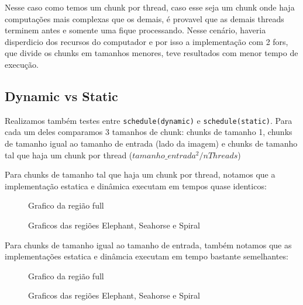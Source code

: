 \documentclass[12pt]{article}
\newcommand{\code}[1]{\texttt{#1}}
\begin{document}
\begin{figure}[H]
\end{figure}

Nesse caso como temos um chunk por thread, caso esse seja um chunk onde haja computações mais complexas que os demais, é provavel que as demais threads terminem antes e somente uma fique processando. Nesse cenário, haveria disperdicio dos recursos do computador e por isso a implementação com 2 fors, que divide os chunks em tamanhos menores, teve resultados com menor tempo de execução.

\subsection{Dynamic vs Static}
Realizamos também testes entre \code{schedule(dynamic)} e \code{schedule(static)}. Para cada um deles comparamos 3 tamanhos de chunk: chunks de tamanho 1, chunks de tamanho igual ao tamanho de entrada (lado da imagem) e chunks de tamanho tal que haja um chunk por thread ($tamanho\_entrada^2 / nThreads$)

Para chunks de tamanho tal que haja um chunk por thread, notamos que a implementação estatica e dinâmica executam em tempos quase identicos:

\begin{figure}[H]
    \caption{Grafico da região full}
\end{figure}
\begin{figure}[H]
    \caption{Graficos das regiões Elephant, Seahorse e Spiral}
\end{figure}

Para chunks de tamanho igual ao tamanho de entrada, também notamos que as implementações estatica e dinâmcia executam em tempo bastante semelhantes:

\begin{figure}[H]
    \caption{Grafico da região full}
\end{figure}
\begin{figure}[H]
    \caption{Graficos das regiões Elephant, Seahorse e Spiral}
\end{figure}
\end{document}
